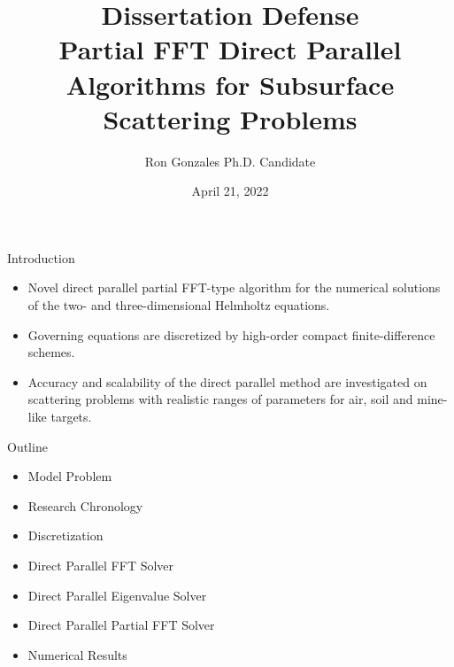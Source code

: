 \documentclass[handout]{beamer}
\title[Subsurface Scattering Problems]{Dissertation Defense \\[1em]
Partial FFT Direct Parallel Algorithms for Subsurface Scattering Problems}
\author[Ron Gonzales]{Ron Gonzales Ph.D. Candidate}
\institute[ISU]{Idaho State University \\ Department of Mathematics and Statistics}
\date{April 21, 2022}
\begin{document}
 
\frame{\titlepage}


\begin{frame}{Introduction}
\begin{itemize}
\item Novel direct parallel partial FFT-type algorithm for the numerical solutions of the two- and three-dimensional Helmholtz equations.\\[1em]
\item Governing equations are discretized by high-order compact finite-difference schemes.\\[1em]
\item Accuracy and scalability of the direct parallel method are investigated on scattering problems with realistic ranges of parameters for air, soil and mine-like targets.\\[1em]
\end{itemize}
\end{frame}




\begin{frame}{Outline}
\begin{itemize}
\item Model Problem\\[1em]
\item Research Chronology\\[1em]
\item Discretization\\[1em]
\item Direct Parallel FFT Solver\\[1em]
\item Direct Parallel Eigenvalue Solver\\[1em]
\item Direct Parallel Partial FFT Solver\\[1em]
\item Numerical Results\\[1em]
\end{itemize}
\end{frame}
\end{document}
